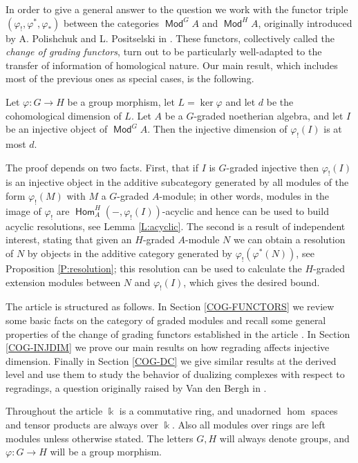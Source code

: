 \documentclass[11pt,fleqn]{article}
\renewcommand\to{\longrightarrow}
\renewcommand\phi{\varphi}
\renewcommand\k{\Bbbk}
\DeclareMathOperator\Mod{\mathsf{Mod}}
\DeclareMathOperator\Hom{\mathsf{Hom}}
\begin{document}
In order to give a general answer to the question we work with the functor 
triple $(\phi_!, \phi^*, \phi_*)$ between the categories $\Mod^G A$ and 
$\Mod^H A$, originally introduced by A. Polishchuk and L. Positselski in 
\cite{PP-secondHH}. These functors, collectively called the \emph{change of 
grading functors}, turn out to be particularly well-adapted to the transfer of 
information of homological nature. Our main result, which includes most of the 
previous ones as special cases, is the following.
\begin{Theorem*}
Let $\phi: G \to H$ be a group morphism, let $L = \ker \phi$ and let $d$ be 
the cohomological dimension of $L$. Let $A$ be a $G$-graded noetherian 
algebra, and let $I$ be an injective object of $\Mod^G A$. Then the injective
dimension of $\phi_!(I)$ is at most $d$. 
\end{Theorem*}
The proof depends on two facts. First, that if $I$ is 
$G$-graded injective then $\phi_!(I)$ is an injective object in the additive 
subcategory generated by all modules of the form $\phi_!(M)$ with $M$ a 
$G$-graded $A$-module; in other words, modules in the image of $\phi_!$ are 
$\Hom_A^H(-,\phi_!(I))$-acyclic and hence can be used to build acyclic 
resolutions, see Lemma \ref{L:acyclic}. The second is a result of independent 
interest, stating that given an $H$-graded $A$-module $N$ we can obtain a 
resolution of $N$ by objects in the additive category generated by 
$\phi_!(\phi^*(N))$, see Proposition \ref{P:resolution}; this resolution 
can be used to calculate the $H$-graded extension modules between $N$ and 
$\phi_!(I)$, which gives the desired bound.  

\bigskip
The article is structured as follows. In Section \ref{COG-FUNCTORS} we review 
some basic facts on the category of graded modules and recall some general 
properties of the change of grading functors established in the article 
\cite{RZ-twisted}. In Section \ref{COG-INJDIM} we 
prove our main results on how regrading affects injective dimension. Finally 
in Section \ref{COG-DC} we give similar results at the derived level and use 
them to  study the behavior of dualizing complexes with respect to regradings,
a question originally raised by Van den Bergh in \cite{VdB-existence-dc}.

\bigskip
Throughout the article $\k$ is a commutative ring, and unadorned $\hom$ 
spaces and tensor products are always over $\k$. Also all modules over rings
are left modules unless otherwise stated. The letters $G, H$ will always denote
groups, and $\phi: G \to H$ will be a group morphism.
\end{document}

